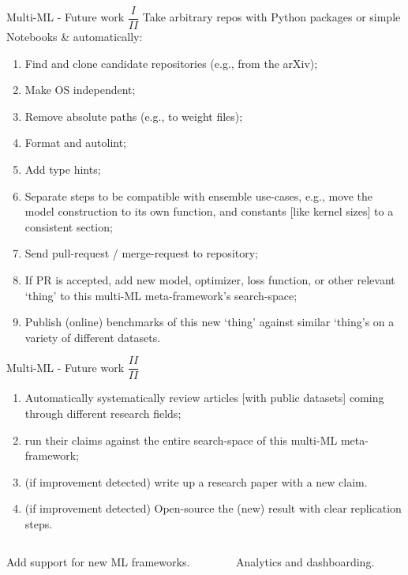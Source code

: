 \documentclass[aspectratio=169,xcolor=dvipsnames]{beamer}
\begin{document}
\begin{frame}{Multi-ML - Future work \(\dfrac{I}{II}\)}
	Take arbitrary repos with Python packages or simple Notebooks \& automatically:

	\begin{enumerate}
		\item[0.] Find and clone candidate repositories (e.g., from the arXiv);
		\item Make OS independent;
		\item Remove absolute paths (e.g., to weight files);
		\item Format and autolint;
		\item Add type hints;
		\item Separate steps to be compatible with ensemble use-cases, e.g., move the model construction to its own function, and constants [like kernel sizes] to a consistent section;
		\item Send pull-request / merge-request to repository;
		\item If PR is accepted, add new model, optimizer, loss function, or other relevant `thing' to this multi-ML meta-framework's search-space;
		\item Publish (online) benchmarks of this new `thing' against similar `thing's on a variety of different datasets.
	\end{enumerate}
\end{frame}

\begin{frame}{Multi-ML - Future work \(\dfrac{II}{II}\)}
	\begin{enumerate}
		\item[0.] Automatically systematically review articles [with public datasets] coming through different research fields;
		\item run their claims against the entire search-space of this multi-ML meta-framework;
		\item (if improvement detected) write up a research paper with a new claim.
		\item (if improvement detected) Open-source the (new) result with clear replication steps.
	\end{enumerate}
	\vspace{2em}

	\begin{columns}
		\begin{column}[T]{0.4\textwidth}
			Add support for new ML frameworks.
		\end{column}
		\begin{column}[T]{0.4\textwidth}
			Analytics and dashboarding.
		\end{column}
	\end{columns}
\end{frame}
\end{document}
